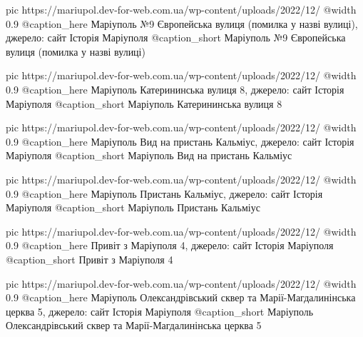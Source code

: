   pic https://mariupol.dev-for-web.com.ua/wp-content/uploads/2022/12/%
  @width 0.9
  @caption_here Маріуполь №9 Європейська вулиця (помилка у назві вулиці), джерело: сайт Історія Маріуполя
  @caption_short Маріуполь №9 Європейська вулиця (помилка у назві вулиці)

  pic https://mariupol.dev-for-web.com.ua/wp-content/uploads/2022/12/%
  @width 0.9
  @caption_here Маріуполь Катерининська вулиця 8, джерело: сайт Історія Маріуполя
  @caption_short Маріуполь Катерининська вулиця 8

  pic https://mariupol.dev-for-web.com.ua/wp-content/uploads/2022/12/%
  @width 0.9
  @caption_here Маріуполь Вид на пристань Кальміус, джерело: сайт Історія Маріуполя
  @caption_short Маріуполь Вид на пристань Кальміус

  pic https://mariupol.dev-for-web.com.ua/wp-content/uploads/2022/12/%
  @width 0.9
  @caption_here Маріуполь Пристань Кальміус, джерело: сайт Історія Маріуполя
  @caption_short Маріуполь Пристань Кальміус

  pic https://mariupol.dev-for-web.com.ua/wp-content/uploads/2022/12/%
  @width 0.9
  @caption_here Привіт з Маріуполя 4, джерело: сайт Історія Маріуполя
  @caption_short Привіт з Маріуполя 4

  pic https://mariupol.dev-for-web.com.ua/wp-content/uploads/2022/12/%
  @width 0.9
  @caption_here Маріуполь Олександрівський сквер та Марії-Магдалинінська церква 5, джерело: сайт Історія Маріуполя
  @caption_short Маріуполь Олександрівський сквер та Марії-Магдалинінська церква 5

